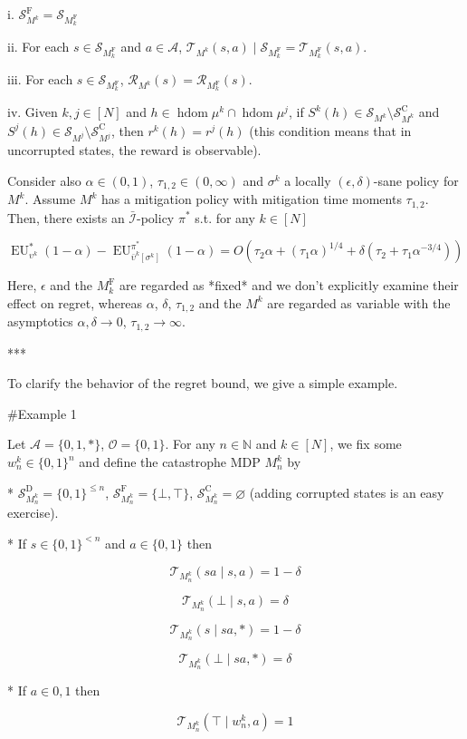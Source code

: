\documentclass[a4paper]{article}
\newcommand{\Bool}{\{0,1\}}
\newcommand{\AP}[1]{\left(#1\right)}
\newcommand{\AB}[1]{\left[#1\right]}
\newcommand{\Nats}{\mathbb{N}}
\newcommand{\Ob}{\mathcal{O}}
\newcommand{\A}{\mathcal{A}}
\newcommand{\St}{\mathcal{S}}
\newcommand{\T}{\mathcal{T}}
\newcommand{\R}{\mathcal{R}}
\newcommand{\In}{\mathcal{I}}
\newcommand{\Adi}{{\bar{\In}}}
\DeclareMathOperator{\HD}{hdom}
\newcommand{\SF}{\St^{\text{F}}}
\newcommand{\SD}{\St^{\text{D}}}
\newcommand{\SC}{\St^{\text{C}}}
\newcommand{\MF}{M^{\text{F}}}
\newcommand{\EU}{\operatorname{EU}}
\begin{document}
i. $\SF_{M^k} = \St_{\MF_k}$

ii. For each $s \in \St_{\MF_k}$ and $a \in \A$, $\T_{M^k}(s,a) \mid \St_{\MF_k} = \T_{\MF_k}(s,a)$.

iii. For each $s \in \St_{\MF_k}$, $\R_{M^k}(s)=\R_{\MF_k}(s)$.

iv. Given $k,j \in [N]$ and $h \in \HD{\mu^k} \cap \HD{\mu^j}$, if $S^k(h) \in \St_{M^k} \setminus \SC_{M^k}$ and $S^j(h) \in \St_{M^j} \setminus \SC_{M^j}$, then $r^k(h)=r^j(h)$ (this condition means that in uncorrupted states, the reward is observable).

Consider also $\alpha\in(0,1)$, $\tau_{1,2} \in (0,\infty)$ and $\sigma^k$ a locally $(\epsilon,\delta)$-sane policy for $M^k$. Assume $M^k$ has a mitigation policy with mitigation time moments $\tau_{1,2}$. Then, there exists an $\Adi$-policy $\pi^*$ s.t. for any $k \in [N]$

$$\EU_{\upsilon^k}^*(1-\alpha) - \EU_{\bar{\upsilon}^k\AB{\sigma^k}}^{\pi^*}(1-\alpha) = O\AP{\tau_2 \alpha + (\tau_1 \alpha)^{1/4} + \delta \AP{\tau_2 + \tau_1 \alpha^{-3/4}}}$$

Here, $\epsilon$ and the $\MF_k$ are regarded as *fixed* and we don't explicitly examine their effect on regret, whereas $\alpha$, $\delta$, $\tau_{1,2}$ and the $M^k$ are regarded as variable with the asymptotics $\alpha,\delta \rightarrow 0$, $\tau_{1,2} \rightarrow \infty$.

***

To clarify the behavior of the regret bound, we give a simple example.

\#Example 1

Let $\A = \{0,1,*\}$, $\Ob=\Bool$. For any $n \in \Nats$ and $k \in [N]$, we fix some $w_n^k \in \Bool^n$ and define the catastrophe MDP $M_n^k$ by

* $\SD_{M_n^k} = \Bool^{\leq n}$, $\SF_{M_n^k} = \{\bot,\top\}$, $\SC_{M_n^k} = \varnothing$ (adding corrupted states is an easy exercise).

* If $s \in \Bool^{< n}$ and $a \in \Bool$ then 

$$\T_{M_n^k}(sa \mid s,a) = 1 - \delta$$

$$\T_{M_n^k}(\bot \mid s,a) = \delta$$

$$\T_{M_n^k}(s \mid sa,*) = 1 - \delta$$

$$\T_{M_n^k}(\bot \mid sa,*) = \delta$$

* If $a \in {0,1}$ then

$$\T_{M_n^k}(\top \mid w_n^k,a) = 1$$
\end{document}
